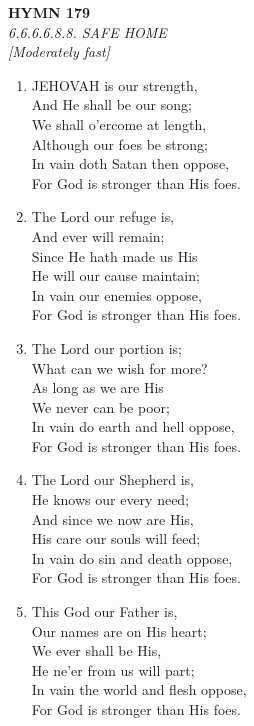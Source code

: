 \newpage
\begin{center}
    {\Large \textbf{HYMN 179}}
    \\
    \textit{6.6.6.6.8.8. SAFE HOME}
    \\
    \textit{\small [Moderately fast]}
\end{center}
\vspace{1em}

\begin{enumerate}
    \item JEHOVAH is our strength, \\
        And He shall be our song; \\
        We shall o'ercome at length, \\
        Although our foes be strong; \\
        In vain doth Satan then oppose, \\
        For God is stronger than His foes.

    \item The Lord our refuge is, \\
        And ever will remain; \\
        Since He hath made us His \\
        He will our cause maintain; \\
        In vain our enemies oppose, \\
        For God is stronger than His foes.

    \item The Lord our portion is; \\
        What can we wish for more? \\
        As long as we are His \\
        We never can be poor; \\
        In vain do earth and hell oppose, \\
        For God is stronger than His foes.

    \item The Lord our Shepherd is, \\
        He knows our every need; \\
        And since we now are His, \\
        His care our souls will feed; \\
        In vain do sin and death oppose, \\
        For God is stronger than His foes.

    \item This God our Father is, \\
        Our names are on His heart; \\
        We ever shall be His, \\
        He ne'er from us will part; \\
        In vain the world and flesh oppose, \\
        For God is stronger than His foes.

\end{enumerate}

